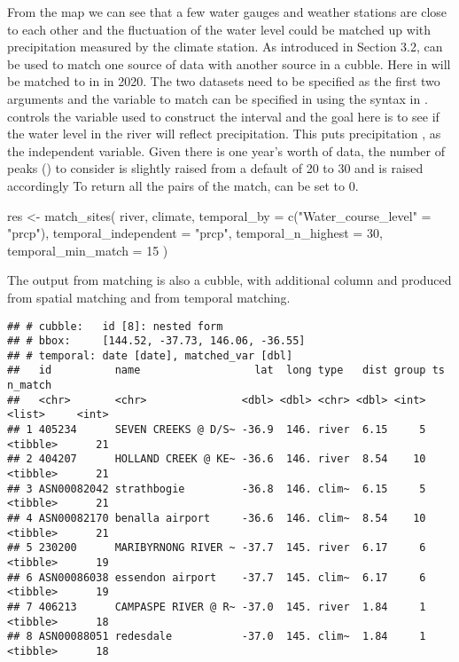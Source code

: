 \documentclass{article}
\newenvironment{Shaded}{\begin{snugshade}}{\end{snugshade}}
\newcommand{\AttributeTok}[1]{\textcolor[rgb]{0.77,0.63,0.00}{#1}}
\newcommand{\DecValTok}[1]{\textcolor[rgb]{0.00,0.00,0.81}{#1}}
\newcommand{\FunctionTok}[1]{\textcolor[rgb]{0.00,0.00,0.00}{#1}}
\newcommand{\NormalTok}[1]{#1}
\newcommand{\OtherTok}[1]{\textcolor[rgb]{0.56,0.35,0.01}{#1}}
\newcommand{\StringTok}[1]{\textcolor[rgb]{0.31,0.60,0.02}{#1}}
\begin{document}
From the map we can see that a few water gauges and weather stations are close to each other and the fluctuation of the water level could be matched up with precipitation measured by the climate station. As introduced in Section 3.2,  can be used to match one source of data with another source in a cubble. Here  in  will be matched to  in  in 2020. The two datasets need to be specified as the first two arguments and the variable to match can be specified in  using the  syntax in .  controls the variable used to construct the interval and the goal here is to see if the water level in the river will reflect precipitation. This puts precipitation , as the independent variable. Given there is one year's worth of data, the number of peaks () to consider is slightly raised from a default of 20 to 30 and  is raised accordingly To return all the pairs of the match,  can be set to 0.

\begin{Shaded}
\begin{Highlighting}[]
\NormalTok{res }\OtherTok{\textless{}{-}} \FunctionTok{match\_sites}\NormalTok{(}
\NormalTok{  river, climate,}
  \AttributeTok{temporal\_by =} \FunctionTok{c}\NormalTok{(}\StringTok{"Water\_course\_level"} \OtherTok{=} \StringTok{"prcp"}\NormalTok{),}
  \AttributeTok{temporal\_independent =} \StringTok{"prcp"}\NormalTok{,  }
  \AttributeTok{temporal\_n\_highest =} \DecValTok{30}\NormalTok{,}
  \AttributeTok{temporal\_min\_match =} \DecValTok{15}
\NormalTok{)}
\end{Highlighting}
\end{Shaded}

The output from matching is also a cubble, with additional column  and  produced from spatial matching and  from temporal matching.

\begin{verbatim}
## # cubble:   id [8]: nested form
## # bbox:     [144.52, -37.73, 146.06, -36.55]
## # temporal: date [date], matched_var [dbl]
##   id          name                  lat  long type   dist group ts       n_match
##   <chr>       <chr>               <dbl> <dbl> <chr> <dbl> <int> <list>     <int>
## 1 405234      SEVEN CREEKS @ D/S~ -36.9  146. river  6.15     5 <tibble>      21
## 2 404207      HOLLAND CREEK @ KE~ -36.6  146. river  8.54    10 <tibble>      21
## 3 ASN00082042 strathbogie         -36.8  146. clim~  6.15     5 <tibble>      21
## 4 ASN00082170 benalla airport     -36.6  146. clim~  8.54    10 <tibble>      21
## 5 230200      MARIBYRNONG RIVER ~ -37.7  145. river  6.17     6 <tibble>      19
## 6 ASN00086038 essendon airport    -37.7  145. clim~  6.17     6 <tibble>      19
## 7 406213      CAMPASPE RIVER @ R~ -37.0  145. river  1.84     1 <tibble>      18
## 8 ASN00088051 redesdale           -37.0  145. clim~  1.84     1 <tibble>      18
\end{verbatim}
\end{document}
